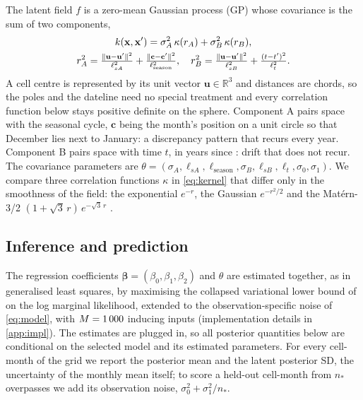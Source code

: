 \documentclass[10pt,twocolumn,a4paper]{article}
\begin{document}
The latent field $f$ is a zero-mean Gaussian process (GP) whose covariance is the sum of two components,
\begin{gather}
k(\mathbf{x},\mathbf{x}') = \sigma_A^2\,\kappa(r_A) + \sigma_B^2\,\kappa(r_B), \label{eq:kernel}\\
r_A^2 = \tfrac{\lVert\mathbf{u}-\mathbf{u}'\rVert^2}{\ell_{sA}^2} + \tfrac{\lVert\mathbf{c}-\mathbf{c}'\rVert^2}{\ell_{\mathrm{season}}^2},\quad
r_B^2 = \tfrac{\lVert\mathbf{u}-\mathbf{u}'\rVert^2}{\ell_{sB}^2} + \tfrac{(t-t')^2}{\ell_t^2}. \notag
\end{gather}
A cell centre is represented by its unit vector $\mathbf{u}\in\mathbb{R}^3$ and distances are chords, so the poles and the dateline need no special treatment and every correlation function below stays positive definite on the sphere. Component A pairs space with the seasonal cycle, $\mathbf{c}$ being the month's position on a unit circle so that December lies next to January: a discrepancy pattern that recurs every year. Component B pairs space with time $t$, in years since \timeOrigin: drift that does not recur. The covariance parameters are $\theta=(\sigma_A,\ell_{sA},\ell_{\mathrm{season}},\sigma_B,\ell_{sB},\ell_t,\sigma_0,\sigma_1)$. We compare three correlation functions $\kappa$ in \cref{eq:kernel} that differ only in the smoothness of the field: the exponential $e^{-r}$, the Gaussian $e^{-r^2/2}$ and the Mat\'ern-3/2 $(1+\sqrt3\,r)\,e^{-\sqrt3\,r}$ \cite{rasmussen2006gpml}.

\subsection{Inference and prediction}
The regression coefficients $\bm\beta=(\beta_0,\beta_1,\beta_2)$ and $\theta$ are estimated together, as in generalised least squares, by maximising the collapsed variational lower bound of \citet{titsias2009vfe} on the log marginal likelihood, extended to the observation-specific noise of \cref{eq:model}, with $M=1\,000$ inducing inputs (implementation details in \cref{app:impl}). The estimates are plugged in, so all posterior quantities below are conditional on the selected model and its estimated parameters. For every cell-month of the grid we report the posterior mean and the latent posterior SD, the uncertainty of the monthly mean itself; to score a held-out cell-month from $n_*$ overpasses we add its observation noise, $\sigma_0^2+\sigma_1^2/n_*$.
\end{document}
